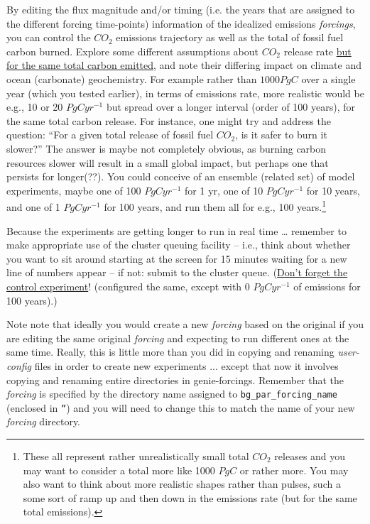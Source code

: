 By editing the flux magnitude and/or timing (i.e. the years that are assigned to the different forcing time-points) information of the idealized emissions \textit{forcings}, you can control the \(CO_{2}\) emissions trajectory as well as the total of fossil fuel carbon burned. Explore some different assumptions about \(CO_{2}\) release rate \uline{but for the same total carbon emitted}, and note their differing impact on climate and ocean (carbonate) geochemistry. For example rather than $1000 PgC$ over a single year (which you tested earlier), in terms of emissions rate, more realistic would be e.g., 10 or 20 \(PgCyr^{-1}\) but spread over a longer interval (order of 100 years), for the same total carbon release. For instance, one might try and address the question: “For a given total release of  fossil fuel \(CO_{2}\), is it safer to burn it slower?” The answer is maybe not completely obvious, as burning carbon resources slower will result in a small global impact, but perhaps one that persists for longer(??). You could conceive of an ensemble (related set) of model experiments, maybe one of 100 \(PgCyr^{-1}\) for 1 yr, one of 10 \(PgCyr^{-1}\) for 10 years, and one of 1 \(PgCyr^{-1}\) for 100 years, and run them all for e.g., 100 years.\footnote{These all represent rather unrealistically small total \(CO_{2}\) releases and you may want to consider a total more like 1000 \(PgC\) or rather more. You may also want to think about more realistic shapes rather than pulses, such a some sort of ramp up and then down in the emissions rate (but for the same total emissions).}

Because the experiments are getting longer to run in real time … remember to make appropriate use of the cluster queuing facility – i.e., think about whether you want to sit around starting at the screen for 15 minutes waiting for a new line of numbers appear – if not: submit to the cluster queue. (\uline{Don’t forget the control experiment}! (configured the same, except with 0 \(PgCyr^{-1}\) of emissions for 100 years).)

\vspace{1mm}

Note note that ideally you would create a new \textit{forcing} based on the original if you are editing the same original  \textit{forcing} and expecting to run different ones at the same time. Really, this is little more than you did in copying and renaming \textit{user-config} files in order to create new experiments ... except that now it involves copying and renaming entire directories in \textsf{\footnotesize genie-forcings}. Remember that the \textit{forcing} is specified by the directory name assigned to \texttt{bg\_par\_forcing\_name} (enclosed in \texttt{''}) and you will need to change this to match the name of your new \textit{forcing} directory.

